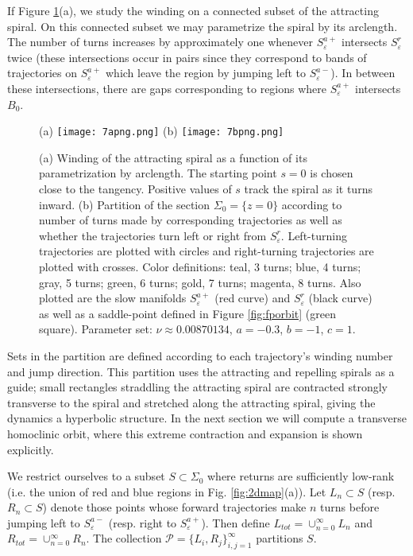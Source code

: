 \documentclass[aip, cha, sd, amsmath,amssymb, preprint]{revtex4-1}
\begin{document}
If Figure \ref{fig:turns}(a), we study the winding on a connected subset of the attracting spiral. On this connected subset we may parametrize the spiral by its arclength. The number of turns increases by approximately one whenever $S^{a+}_{ \varepsilon}$ intersects $S^{r}_{ \varepsilon}$ twice (these intersections occur in pairs since they correspond to bands of trajectories on $S^{a+}_{ \varepsilon}$ which leave the region by jumping left to $S^{a-}_{ \varepsilon}$). In between these intersections, there are gaps corresponding to regions where $S^{a+}_{ \varepsilon}$ intersects $B_0$. 

\begin{figure}
(a) \texttt{[image: 7apng.png]}
(b) \texttt{[image: 7bpng.png]}
\caption{\label{fig:turns} (a) Winding of the attracting spiral as a function of its parametrization by arclength. The starting point $s = 0$ is chosen close to the tangency. Positive values of $s$ track the spiral as it turns inward. (b) Partition of the section $\Sigma_0 = \{z = 0\}$ according to number of turns made by corresponding trajectories as well as whether the trajectories turn left or right from $S^r_{ \varepsilon}$. Left-turning trajectories are plotted with circles and right-turning trajectories are plotted with crosses. Color definitions: teal, 3 turns; blue, 4 turns; gray, 5 turns; green, 6 turns; gold, 7 turns; magenta, 8 turns. Also plotted are the slow manifolds $S^{a+}_{ \varepsilon}$ (red curve) and $S^r_{ \varepsilon}$ (black curve) as well as a saddle-point defined in Figure \ref{fig:fporbit} (green square). Parameter set: $\nu \approx 0.00870134$, $a = -0.3$, $b = -1$, $c = 1$.}
\end{figure}

Sets in the partition are defined according to each trajectory's winding number and jump direction. This partition uses the attracting and repelling spirals as a guide; small rectangles straddling the attracting spiral are contracted strongly transverse to the spiral and stretched along the attracting spiral, giving the dynamics a hyperbolic structure. In the next section we will compute a transverse homoclinic orbit, where this extreme contraction and expansion is shown explicitly.

We restrict ourselves to a subset $S \subset \Sigma_0$ where returns are sufficiently low-rank (i.e. the union of red and blue regions in Fig. \ref{fig:2dmap}(a)). Let $L_{n}\subset S$ (resp. $R_n \subset S$) denote those points whose forward trajectories make $n$ turns before jumping left to $S^{a-}_{ \varepsilon}$ (resp. right to $S^{a+}_{ \varepsilon}$). Then define $L_{tot} =  \cup_{n=0}^{\infty} L_n$ and $R_{tot} = \cup_{n=0}^{\infty} R_n$. The collection $\mathcal{P} = \{L_i,R_j\}_{i,j=1}^{\infty}$ partitions $S$. 
\end{document}
